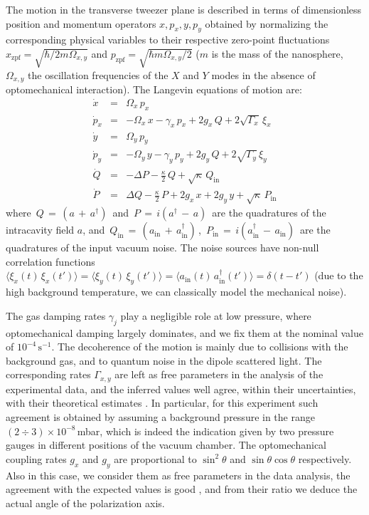 \documentclass[11pt,floatfix,amssymb,prx,aps,longbibliography,superscriptaddress,nopacs]{revtex4-2}
\newcommand{\OmegaXY}{\Omega_{\scriptstyle{x,y}}}
\newcommand{\OmegaX}{\Omega_{\scriptstyle{x}}}
\newcommand{\OmegaY}{\Omega_{\scriptstyle{y}}}
\newcommand{\GY}{\Gamma_{\scriptstyle{y}}}
\newcommand{\GX}{\Gamma_{\scriptstyle{x}}}
\newcommand{\GXY}{\Gamma_{\scriptstyle{x,y}}}
\newcommand{\gX}{g_{\scriptstyle{x}}}
\newcommand{\gY}{g_{\scriptstyle{y}}}
\newcommand{\xzpf}{x_{\mathrm{zpf}}}
\newcommand{\pzpf}{p_{\mathrm{zpf}}}
\newcommand{\xX}{x}
\newcommand{\xY}{y}
\newcommand{\pX}{p_{\scriptstyle{x}}}
\newcommand{\pY}{p_{\scriptstyle{y}}}
\newcommand{\xiX}{\xi_{\scriptstyle{x}}}
\newcommand{\xiY}{\xi_{\scriptstyle{y}}}
\begin{document}
The motion in the transverse tweezer plane is described in terms of dimensionless position and momentum operators $\xX, \pX, \xY, \pY$ obtained by normalizing the corresponding physical variables to their respective zero-point fluctuations $\xzpf = \sqrt{\hbar/2 m \OmegaXY}$ and $\pzpf = \sqrt{\hbar m \OmegaXY/2 }$ ($m$ is the mass of the nanosphere, $\OmegaXY$ the oscillation frequencies of the $X$ and $Y$ modes in the absence of optomechanical interaction). The Langevin equations of motion are:
\begin{eqnarray}
\dot{x} & = & \OmegaX \,\pX 
\label{eq_dxdt}\\
\dot{p}_{\scriptstyle{x}} &=& -\OmegaX \,\xX -\gamma_x \,\pX + 2 \gX\, Q + 2 \sqrt{\GX} \,\xiX \\
\dot{y} & = & \OmegaY \,\pY \\
\dot{p}_{\scriptstyle{y}} &=& -\OmegaY \,\xY -\gamma_y \,\pY + 2 \gY \,Q + 2 \sqrt{\GY} \,\xiY \\
\dot{Q} &=& -\Delta P -\frac{\kappa}{2} \,Q + \sqrt{\kappa}\, Q_{\mathrm{in}}  \\
\dot{P} &=& \Delta Q -\frac{\kappa}{2}\, P + 2 \gX \,\xX + 2 \gY\, \xY + \sqrt{\kappa}\, P_{\mathrm{in}}
\label{eq_dPdt}
\end{eqnarray}
where $\,Q\,=\,(a\,+\,a^{\dag})\,$ and  $\,P\,=\,i(a^{\dag}\,-\,a)\,$ are the quadratures of the intracavity field $a$, and $\,Q_{\mathrm{in}}\,=\,(a_{\mathrm{in}}\,+\,a_{\mathrm{in}}^{\dag})\,$,  $\,P_{\mathrm{in}}\,=\,i(a_{\mathrm{in}}^{\dag}\,-\,a_{\mathrm{in}})\,$ are the quadratures of the input vacuum noise. The noise sources have non-null correlation functions $\langle \xiX(t) \, \xiX(t')\rangle = \langle \xiY(t) \, \xiY(t')\rangle = \langle a_{\mathrm{in}}(t) \, a^{\dag}_{\mathrm{in}}(t')\rangle= \delta(t-t')$ (due to the high background temperature, we can classically model the mechanical noise). 

The gas damping rates $\gamma_j$ play a negligible role at low pressure, where optomechanical damping largely dominates, and we fix them at the nominal value of $10^{-4} \,\mathrm{s}^{-1}$. The decoherence of the motion is mainly due to collisions with the background gas, and to quantum noise in the dipole scattered light. The corresponding rates $\GXY$ are left as free parameters in the analysis of the experimental data, and the inferred values well agree, within their uncertainties, with their theoretical estimates \cite{Ranfagni2022}. In particular, for this experiment such agreement is obtained by assuming a background pressure in the range $(2 \div 3) \times 10^{-8}\,$mbar, which is indeed the indication given by two pressure gauges in different positions of the vacuum chamber.  
The optomechanical coupling rates $\gX$ and $\gY$ are proportional to $\sin^2 \theta$ and $\sin \theta \cos \theta$ respectively. Also in this case, we consider them as free parameters in the data analysis, the agreement with the expected values is good \cite{Ranfagni2022}, and from their ratio we deduce the actual angle of the polarization axis. 
\end{document}
